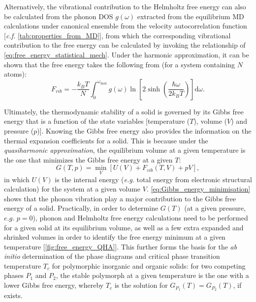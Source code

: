Alternatively, the vibrational contribution to the Helmholtz free energy can also be calculated from the phonon DOS $g(\omega)$ extracted from the equilibrium MD calculations under canonical ensemble from the velocity autocorrelation function [\emph{c.f.} \cref{tab:properties_from_MD}], from which the corresponding vibrational contribution to the free energy can be calculated by invoking the relationship of \cref{eq:free_energy_statistical_mech}. Under the harmonic approximation, it can be shown that the free energy takes the following from (for a system containing $N$ atoms):
\begin{equation}
    \label{eq:phonon_FE_from_density}
    F_{vib}=-\frac{k_{B}T}{N}\int_{0}^{\omega_{\max}}g(\omega)\ln\left[2\sinh\left(\frac{\hbar\omega}{2k_{B}T}\right)\right]\mbox{d}\omega.
\end{equation}


Ultimately, the thermodynamic stability of a solid is governed by its Gibbs free energy that is a function of the state variables [temperature ($T$), volume ($V$) and pressure ($p$)]. Knowing the Gibbs free energy also provides the information on the thermal expansion coefficients for a solid. This is because under the \emph{quasiharmonic approximation}, the equilibrium volume at a given temperature is the one that minimizes the Gibbs free energy at a given $T$:\cite{togo2010first}
\begin{equation}\label{eq:Gibbs_energy_minimisation}
    G(T,p)=\min_{V}\left[U(V)+F_{vib}(T,V)+pV\right],
\end{equation}
in which $U(V)$ is the internal energy (\emph{e.g.} total energy from electronic structural calculation) for the system at a given volume $V$. \cref{eq:Gibbs_energy_minimisation} shows that the phonon vibration play a major contribution to the Gibbs free energy of a solid. Practically, in order to determine $G(T)$ (at a given pressure, $e.g.$ $p=0$), phonon and Helmholtz free energy calculations need to be performed for a given solid at its equilibrium volume, as well as a few extra  expanded and shrinked volumes in order to identify the free energy minimum at a given temperature [\cref{fig:free_energy_QHA}].  This further forms the basis for the \emph{ab initio} determination of the phase diagrams and critical phase transition temperature $T_{c}$ for polymorphic inorganic\cite{da2015phase} and organic\cite{nyman2015static} solids: for two competing phases $P_1$ and $P_2$, the stable polymorph at a given temperature is the one with a lower Gibbs free energy, whereby $T_{c}$ is the solution for $G_{P_1}(T)=G_{P_2}(T)$, if exists. 
